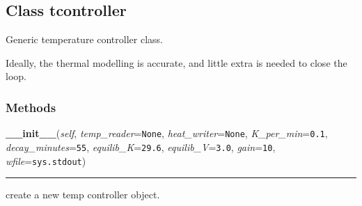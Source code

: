 
\subsection{Class tcontroller}

    \label{tempcontrol:tcontroller}
Generic temperature controller class.

Ideally, the thermal modelling is accurate, and little extra is needed to 
close the loop.



  \subsubsection{Methods}

    \label{tempcontrol:tcontroller:__init__}

    \vspace{0.5ex}

    \begin{boxedminipage}{\textwidth}

    \raggedright \textbf{\_\_init\_\_}(\textit{self}, \textit{temp\_reader}=\texttt{None}, \textit{heat\_writer}=\texttt{None}, \textit{K\_per\_min}=\texttt{0.1}, \textit{decay\_minutes}=\texttt{55}, \textit{equilib\_K}=\texttt{29.6}, \textit{equilib\_V}=\texttt{3.0}, \textit{gain}=\texttt{10}, \textit{wfile}=\texttt{sys.stdout})

    \vspace{-1.5ex}

    \rule{\textwidth}{0.5\fboxrule}
    create a new temp controller object.

    \vspace{1ex}

    \end{boxedminipage}

    \label{tempcontrol:tcontroller:watts}

